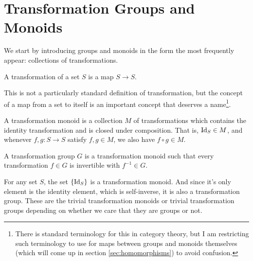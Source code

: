 \section{Transformation Groups and Monoids}
We start by introducing groups and monoids in the form the most frequently appear: collections of transformations.
\begin{definition}[Transformation]
    A transformation of a set $S$ is a map $S \to S$. 
\end{definition}
\begin{remark}
    This is not a particularly standard definition of transformation, but the concept of a map from a set to itself is an important concept that deserves a name\footnote{There is standard terminology for this in category theory, but I am restricting such terminology to use for maps between groups and monoids themselves (which will come up in section \ref{sec:homomorphisms}) to avoid confusion.}.
\end{remark}
\begin{definition}
    A transformation monoid is a collection $M$ of transformations which contains the identity transformation and is closed under composition. That is, $\operatorname{Id}_S \in M$, and whenever $f,g \colon S \to S$ satisfy $f,g \in M$, we also have $f \circ g \in M$.
\end{definition}
\begin{definition}
    A transformation group $G$ is a transformation monoid such that every transformation $f \in G$ is invertible with $f^{-1} \in G$.
\end{definition}

\begin{example}
    For any set $S$, the set $\{\operatorname{Id}_S\}$ is a transformation monoid. And since it's only element is the identity element, which is self-inverse, it is also a transformation group. These are the trivial transformation monoids or trivial transformation groups depending on whether we care that they are groups or not.
\end{example}

